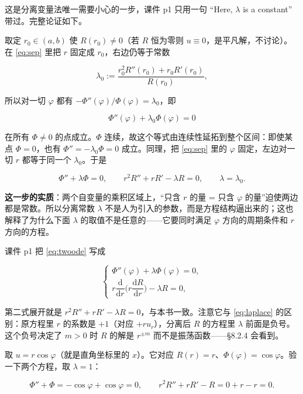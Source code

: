 这是分离变量法唯一需要小心的一步，课件 p1 只用一句 “Here, $\lambda$ is a constant” 带过。完整论证如下。

取定 $r_0\in(a,b)$ 使 $R(r_0)\ne0$（若 $R$ 恒为零则 $u\equiv0$，是平凡解，不讨论）。在 \eqref{eq:sep} 里把 $r$ 固定成 $r_0$，右边仍等于常数

\[
\lambda_0:=\frac{r_0^2R''(r_0)+r_0R'(r_0)}{R(r_0)},
\]

所以对一切 $\varphi$ 都有 $-\Phi''(\varphi)/\Phi(\varphi)=\lambda_0$，即

\[
\Phi''(\varphi)+\lambda_0\Phi(\varphi)=0
\]

在所有 $\Phi\ne0$ 的点成立。$\Phi$ 连续，故这个等式由连续性延拓到整个区间：即使某点 $\Phi=0$，也有 $\Phi''=-\lambda_0\Phi=0$ 成立。同理，把 \eqref{eq:sep} 里的 $\varphi$ 固定，左边对一切 $r$ 都等于同一个 $\lambda_0$。于是

\begin{equation}
\Phi''+\lambda\Phi=0,
\qquad
r^2R''+rR'-\lambda R=0,
\qquad \lambda=\lambda_0 .
\label{eq:twoode}
\end{equation}

\textbf{这一步的实质}：两个自变量的乘积区域上，“只含 $r$ 的量 = 只含 $\varphi$ 的量”迫使两边都是常数。所以分离常数 $\lambda$ 不是人为引入的参数，而是方程结构逼出来的；这也解释了为什么下面 $\lambda$ 的取值不是任意的——它要同时满足 $\varphi$ 方向的周期条件和 $r$ 方向的方程。


课件 p1 把 \eqref{eq:twoode} 写成

\[
\begin{cases}
\Phi''(\varphi)+\lambda\Phi(\varphi)=0,\\[2pt]
r\dfrac{\mathrm d}{\mathrm dr}\Big(r\dfrac{\mathrm dR}{\mathrm dr}\Big)-\lambda R=0,
\end{cases}
\]

第二式展开就是 $r^2R''+rR'-\lambda R=0$，与本书一致。注意它与 \eqref{eq:laplace} 的区别：原方程里 $r$ 的系数是 $+1$（对应 $+ru_r$），分离后 $R$ 的方程里 $\lambda$ 前面是负号。这个负号决定了 $m>0$ 时 $R$ 的解是 $r^{\pm m}$ 而不是振荡函数——\S8.2.4 会看到。


取 $u=r\cos\varphi$（就是直角坐标里的 $x$）。它对应 $R(r)=r$、$\Phi(\varphi)=\cos\varphi$。验一下两个方程，取 $\lambda=1$：

\[
\Phi''+\Phi=-\cos\varphi+\cos\varphi=0,\qquad
r^2R''+rR'-R=0+r-r=0 .
\]


